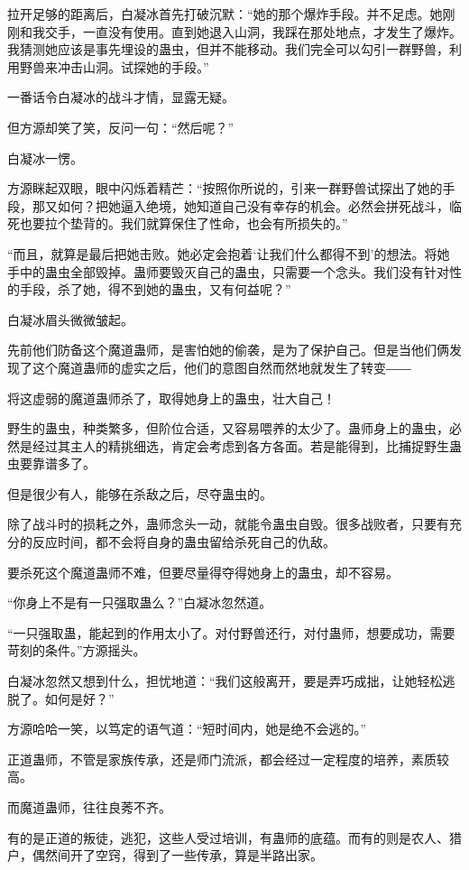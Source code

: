 \begin{this_body}
拉开足够的距离后，白凝冰首先打破沉默：“她的那个爆炸手段。并不足虑。她刚刚和我交手，一直没有使用。直到她退入山洞，我踩在那处地点，才发生了爆炸。我猜测她应该是事先埋设的蛊虫，但并不能移动。我们完全可以勾引一群野兽，利用野兽来冲击山洞。试探她的手段。”

一番话令白凝冰的战斗才情，显露无疑。

但方源却笑了笑，反问一句：“然后呢？”

白凝冰一愣。

方源眯起双眼，眼中闪烁着精芒：“按照你所说的，引来一群野兽试探出了她的手段，那又如何？把她逼入绝境，她知道自己没有幸存的机会。必然会拼死战斗，临死也要拉个垫背的。我们就算保住了性命，也会有所损失的。”

“而且，就算是最后把她击败。她必定会抱着‘让我们什么都得不到’的想法。将她手中的蛊虫全部毁掉。蛊师要毁灭自己的蛊虫，只需要一个念头。我们没有针对性的手段，杀了她，得不到她的蛊虫，又有何益呢？”

白凝冰眉头微微皱起。

先前他们防备这个魔道蛊师，是害怕她的偷袭，是为了保护自己。但是当他们俩发现了这个魔道蛊师的虚实之后，他们的意图自然而然地就发生了转变――

将这虚弱的魔道蛊师杀了，取得她身上的蛊虫，壮大自己！

野生的蛊虫，种类繁多，但阶位合适，又容易喂养的太少了。蛊师身上的蛊虫，必然是经过其主人的精挑细选，肯定会考虑到各方各面。若是能得到，比捕捉野生蛊虫要靠谱多了。

但是很少有人，能够在杀敌之后，尽夺蛊虫的。

除了战斗时的损耗之外，蛊师念头一动，就能令蛊虫自毁。很多战败者，只要有充分的反应时间，都不会将自身的蛊虫留给杀死自己的仇敌。

要杀死这个魔道蛊师不难，但要尽量得夺得她身上的蛊虫，却不容易。

“你身上不是有一只强取蛊么？”白凝冰忽然道。

“一只强取蛊，能起到的作用太小了。对付野兽还行，对付蛊师，想要成功，需要苛刻的条件。”方源摇头。

白凝冰忽然又想到什么，担忧地道：“我们这般离开，要是弄巧成拙，让她轻松逃脱了。如何是好？”

方源哈哈一笑，以笃定的语气道：“短时间内，她是绝不会逃的。”

正道蛊师，不管是家族传承，还是师门流派，都会经过一定程度的培养，素质较高。

而魔道蛊师，往往良莠不齐。

有的是正道的叛徒，逃犯，这些人受过培训，有蛊师的底蕴。而有的则是农人、猎户，偶然间开了空窍，得到了一些传承，算是半路出家。


\end{this_body}
